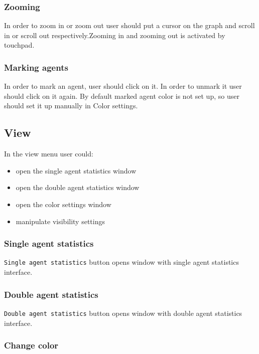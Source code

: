 \documentclass[thesis=B,english]{FITthesis}[2019/12/23]
\begin{document}
\subsubsection{Zooming}

In order to zoom in or zoom out user should put a cursor on the graph and scroll in or scroll out respectively.Zooming in and zooming out is activated by touchpad. 

\subsubsection{Marking agents}

In order to mark an agent, user should click on it. In order to unmark it user should click on it again. By default marked agent color is not set up, so user should set it up manually in Color settings.

\subsection{View}

In the view menu user could:
\begin{itemize}
\item open the single agent statistics window
\item open the double agent statistics window
\item open the color settings window
\item manipulate visibility settings
\end{itemize}


\subsubsection{Single agent statistics}

\verb|Single agent statistics| button opens window with single agent statistics interface.

\subsubsection{Double agent statistics}

\verb|Double agent statistics| button opens window with double agent statistics interface.

\subsubsection{Change color}
\end{document}
